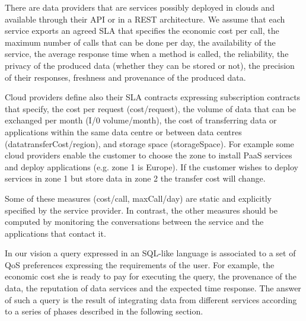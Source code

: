 There are data providers that are services possibly deployed in clouds and available  through their API or in a REST architecture. We assume that  each service exports an agreed SLA that specifies the economic cost per call, the maximum number of calls that can be done per day, the availability of the service, the average response time when a method is called, the reliability, the privacy of the produced data (whether they can be stored or not), the precision of their responses, freshness and provenance of the produced data.  



Cloud providers define also their SLA contracts expressing  subscription contracts that specify, the cost per request ({\sf cost/request}), the volume of data that can be exchanged per month ({\sf I/0 volume/month}), the cost of transferring data or applications within the same data centre or between data centres ({\sf datatransferCost/region}), and storage space ({\sf storageSpace}). For example some cloud providers enable the customer to choose the zone to install PaaS services and deploy applications (e.g. zone 1 is Europe). If the customer wishes to deploy services in zone 1 but store data in zone 2 the transfer cost will change.



Some of these measures ({\sf cost/call, maxCall/day}) are static and explicitly specified by the service provider. 
In contrast, the other measures should be computed by monitoring the conversations between the service and the applications that contact it.  

In our vision a query expressed in an SQL-like language is associated to a set of QoS preferences expressing the requirements of the user. For example, the economic cost she is ready to pay for executing the query, the provenance of the data, the reputation of data services and the expected time response. The answer of such a query is the result of integrating data from different services according to a series of phases described in the following section.

